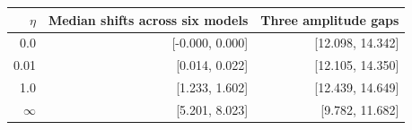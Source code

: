 \begin{tabular}{rrr}
\toprule
$\eta$ & Median shifts across six models & Three amplitude gaps \\
\midrule
0.0 & [-0.000, 0.000] & [12.098, 14.342] \\
0.01 & [0.014, 0.022] & [12.105, 14.350] \\
1.0 & [1.233, 1.602] & [12.439, 14.649] \\
$\infty$ & [5.201, 8.023] & [9.782, 11.682] \\
\bottomrule
\end{tabular}
